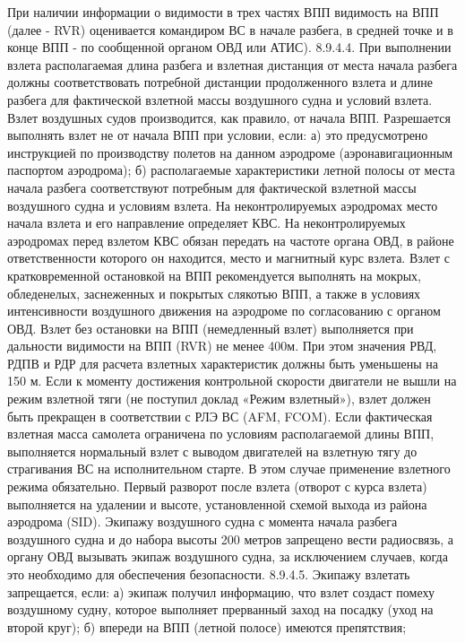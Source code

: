При наличии информации о видимости в трех частях ВПП видимость на ВПП (далее - RVR) оценивается командиром ВС в начале разбега, в средней точке и в конце ВПП - по сообщенной органом ОВД или АТИС). 
8.9.4.4. При выполнении взлета располагаемая длина разбега и взлетная дистанция от места начала разбега должны соответствовать потребной дистанции продолженного взлета и длине разбега для фактической взлетной массы воздушного судна и условий взлета. 
Взлет воздушных судов производится, как правило, от начала ВПП. 
Разрешается выполнять взлет не от начала ВПП при условии, если:
а)	это предусмотрено инструкцией по производству полетов на данном аэродроме (аэронавигационным паспортом аэродрома);
б)	располагаемые характеристики летной полосы от места начала разбега соответствуют потребным для фактической взлетной массы воздушного судна и условиям взлета. 
На неконтролируемых аэродромах место начала взлета и его направление определяет КВС. На неконтролируемых аэродромах перед взлетом КВС обязан передать на частоте органа ОВД, в районе ответственности которого он находится, место и магнитный курс взлета. 
Взлет с кратковременной остановкой на ВПП рекомендуется выполнять на мокрых, обледенелых, заснеженных и покрытых слякотью ВПП, а также в условиях интенсивности воздушного движения на аэродроме по согласованию с органом ОВД. 
Взлет без остановки на ВПП (немедленный взлет) выполняется при дальности видимости на ВПП (RVR) не менее 400м. При этом значения РВД, РДПВ и РДР для расчета взлетных характеристик должны быть уменьшены на 150 м. 
Если к моменту достижения контрольной скорости двигатели не вышли на режим взлетной тяги (не поступил доклад «Режим взлетный»), взлет должен быть прекращен в соответствии с РЛЭ ВС (AFM, FCOM). 
Если фактическая взлетная масса самолета ограничена по условиям располагаемой длины ВПП, выполняется нормальный взлет с выводом двигателей на взлетную тягу до страгивания ВС на исполнительном старте. В этом случае применение взлетного режима обязательно.
Первый разворот после взлета (отворот с курса взлета) выполняется на удалении и высоте, установленной схемой выхода из района аэродрома (SID).
Экипажу воздушного судна с момента начала разбега воздушного судна и до набора высоты 200 метров запрещено вести радиосвязь, а органу ОВД вызывать экипаж воздушного судна, за исключением случаев, когда это необходимо для обеспечения безопасности. 
8.9.4.5.  Экипажу взлетать запрещается, если:
а)	экипаж получил информацию, что взлет создаст помеху воздушному судну, которое выполняет прерванный заход на посадку (уход на второй круг); 
б)	впереди на ВПП (летной полосе) имеются препятствия; 
